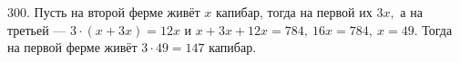 300. Пусть на второй ферме живёт $x$ капибар, тогда на первой их $3x,$ а на третьей --- $3\cdot(x+3x)=12x$ и $x+3x+12x=784,\ 16x=784,\ x=49.$ Тогда на первой ферме живёт $3\cdot49=147$ капибар.\\
